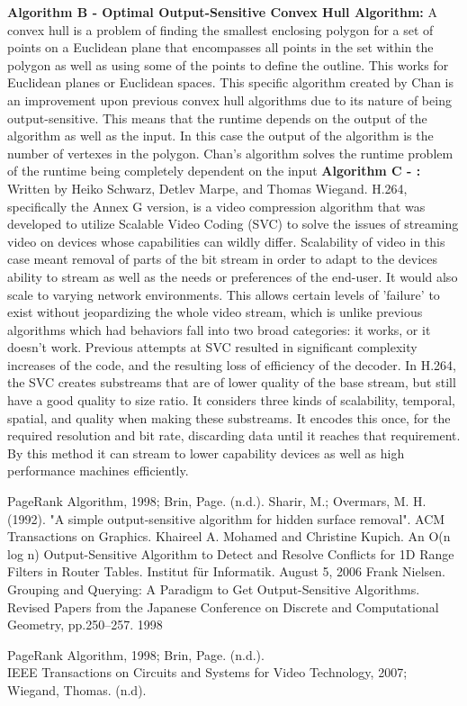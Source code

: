 \documentclass[12pt]{article}
\begin{document}
\noindent
\textbf{Algorithm B - Optimal Output-Sensitive Convex Hull Algorithm:}\smallskip
A convex hull is a problem of finding the smallest enclosing polygon for a set of points on a Euclidean plane that encompasses all points in the set within the polygon as well as using some of the points to define the outline. This works for Euclidean planes or Euclidean spaces. This specific algorithm created by Chan is an improvement upon previous convex hull algorithms due to its nature of being output-sensitive. This means that the runtime depends on the output of the algorithm as well as the input. In this case the output of the algorithm is the number of vertexes in the polygon. Chan's algorithm solves the runtime problem of the runtime being completely dependent on the input
\bigskip
\noindent
\textbf{Algorithm C - :}\smallskip
Written by Heiko Schwarz, Detlev Marpe, and Thomas Wiegand. H.264, specifically the Annex G version, is a video compression algorithm that was developed to utilize Scalable Video Coding (SVC) to solve the issues of streaming video on devices whose capabilities can wildly differ. Scalability of video in this case meant removal of parts of the bit stream in order to adapt to the devices ability to stream as well as the needs or preferences of the end-user. It would also scale to varying network environments. This allows certain levels of 'failure' to exist without jeopardizing the whole video stream, which is unlike previous algorithms which had behaviors fall into two broad categories: it works, or it doesn't work. \newline
Previous attempts at SVC resulted in significant complexity increases of the code, and the resulting loss of efficiency of the decoder. In H.264, the SVC creates substreams that are of lower quality of the base stream, but still have a good quality to size ratio. It considers three kinds of scalability, temporal, spatial, and quality when making these substreams. It encodes this once, for the required resolution and bit rate, discarding data until it reaches that requirement. By this method it can stream to lower capability devices as well as high performance machines efficiently.
\bigskip

PageRank Algorithm, 1998; Brin, Page. (n.d.).
Sharir, M.; Overmars, M. H. (1992). "A simple output-sensitive algorithm for hidden surface removal". ACM Transactions on Graphics.
 Khaireel A. Mohamed and Christine Kupich. An O(n log n) Output-Sensitive Algorithm to Detect and Resolve Conflicts for 1D Range Filters in Router Tables. Institut für Informatik. August 5, 2006
  Frank Nielsen. Grouping and Querying: A Paradigm to Get Output-Sensitive Algorithms. Revised Papers from the Japanese Conference on Discrete and Computational Geometry, pp.250–257. 1998
  
PageRank Algorithm, 1998; Brin, Page. (n.d.). \\
IEEE Transactions on Circuits and Systems for Video Technology, 2007; Wiegand, Thomas. (n.d).
\end{document}
